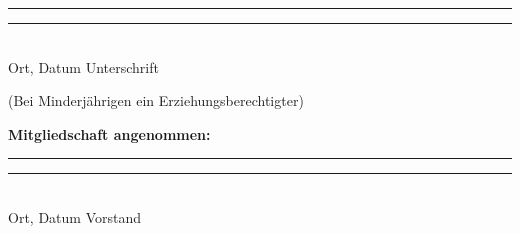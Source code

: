 \vspace{.5cm}
\rule{3.8cm}{.3pt} \hfill \rule{3.8cm}{.3pt} \\
\qquad Ort, Datum \hfill \qquad Unterschrift\\ 
\begin{flushright}
\vspace{-.8cm}
\small
(Bei Minderjährigen ein Erziehungsberechtigter)
\end{flushright}

\textbf{Mitgliedschaft angenommen:}\\

\vspace{.0cm}
\rule{3.8cm}{.3pt} \hfill \rule{3.8cm}{.3pt} \\
\qquad Ort, Datum \hfill \qquad Vorstand